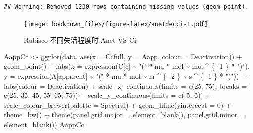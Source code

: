 \documentclass[
]{krantz}
\makeatletter
\newenvironment{Shaded}{\begin{snugshade}}{\end{snugshade}}
\newcommand{\AttributeTok}[1]{\textcolor[rgb]{0.77,0.63,0.00}{#1}}
\newcommand{\DecValTok}[1]{\textcolor[rgb]{0.00,0.00,0.81}{#1}}
\newcommand{\FunctionTok}[1]{\textcolor[rgb]{0.00,0.00,0.00}{#1}}
\newcommand{\NormalTok}[1]{#1}
\newcommand{\OtherTok}[1]{\textcolor[rgb]{0.56,0.35,0.01}{#1}}
\newcommand{\SpecialCharTok}[1]{\textcolor[rgb]{0.00,0.00,0.00}{#1}}
\newcommand{\StringTok}[1]{\textcolor[rgb]{0.31,0.60,0.02}{#1}}
\newenvironment{kframe}{%
\medskip{}
\setlength{\fboxsep}{.8em}
 \def\at@end@of@kframe{}%
 \ifinner\ifhmode%
  \def\at@end@of@kframe{\end{minipage}}%
  \begin{minipage}{\columnwidth}%
 \fi\fi%
 \def\FrameCommand##1{\hskip\@totalleftmargin \hskip-\fboxsep
 \colorbox{shadecolor}{##1}\hskip-\fboxsep
     \hskip-\linewidth \hskip-\@totalleftmargin \hskip\columnwidth}%
 \MakeFramed {\advance\hsize-\width
   \@totalleftmargin\z@ \linewidth\hsize
   \@setminipage}}%
 {\par\unskip\endMakeFramed%
 \at@end@of@kframe}
\renewenvironment{Shaded}{\begin{kframe}}{\end{kframe}}
\makeatother
\begin{document}
\begin{verbatim}
## Warning: Removed 1230 rows containing missing values (geom_point).
\end{verbatim}

\begin{figure}
\centering
\texttt{[image: bookdown\_files/figure-latex/anetdecci-1.pdf]}
\caption{\label{fig:anetdecci}Rubisco 不同失活程度时 Anet VS Ci}
\end{figure}

\begin{Shaded}
\begin{Highlighting}[]
\NormalTok{AappCc }\OtherTok{\textless{}{-}}
  \FunctionTok{ggplot}\NormalTok{(data, }\FunctionTok{aes}\NormalTok{(}\AttributeTok{x =}\NormalTok{ Ccfull, }\AttributeTok{y =}\NormalTok{ Aapp, }\AttributeTok{colour =}\NormalTok{ Deactivation)) }\SpecialCharTok{+}
  \FunctionTok{geom\_point}\NormalTok{() }\SpecialCharTok{+}
  \FunctionTok{labs}\NormalTok{(}\AttributeTok{x =} \FunctionTok{expression}\NormalTok{(C[c] }\SpecialCharTok{\textasciitilde{}} \StringTok{"("} \SpecialCharTok{*}\NormalTok{ mu }\SpecialCharTok{*}\NormalTok{ mol }\SpecialCharTok{\textasciitilde{}}\NormalTok{ mol }\SpecialCharTok{\^{}}\NormalTok{ \{}
    \SpecialCharTok{{-}}\DecValTok{1}
\NormalTok{  \} }\SpecialCharTok{*} \StringTok{")"}\NormalTok{),}
  \AttributeTok{y =} \FunctionTok{expression}\NormalTok{(A[apparent] }\SpecialCharTok{\textasciitilde{}} \StringTok{"("} \SpecialCharTok{*}\NormalTok{ mu }\SpecialCharTok{*}\NormalTok{ mol }\SpecialCharTok{\textasciitilde{}}\NormalTok{ m }\SpecialCharTok{\^{}}\NormalTok{ \{}
    \SpecialCharTok{{-}}\DecValTok{2}
\NormalTok{  \} }\SpecialCharTok{\textasciitilde{}}\NormalTok{ s }\SpecialCharTok{\^{}}\NormalTok{ \{}
    \SpecialCharTok{{-}}\DecValTok{1}
\NormalTok{  \} }\SpecialCharTok{*} \StringTok{")"}\NormalTok{)) }\SpecialCharTok{+}
  \FunctionTok{labs}\NormalTok{(}\AttributeTok{colour =} \StringTok{\textquotesingle{}Deactivation\textquotesingle{}}\NormalTok{) }\SpecialCharTok{+}
  \FunctionTok{scale\_x\_continuous}\NormalTok{(}\AttributeTok{limits =} \FunctionTok{c}\NormalTok{(}\DecValTok{25}\NormalTok{, }\DecValTok{75}\NormalTok{),}
                     \AttributeTok{breaks =} \FunctionTok{c}\NormalTok{(}\DecValTok{25}\NormalTok{, }\DecValTok{35}\NormalTok{, }\DecValTok{45}\NormalTok{, }\DecValTok{55}\NormalTok{, }\DecValTok{65}\NormalTok{, }\DecValTok{75}\NormalTok{)) }\SpecialCharTok{+}
  \FunctionTok{scale\_y\_continuous}\NormalTok{(}\AttributeTok{limits =} \FunctionTok{c}\NormalTok{(}\SpecialCharTok{{-}}\DecValTok{5}\NormalTok{, }\DecValTok{5}\NormalTok{)) }\SpecialCharTok{+}
  \FunctionTok{scale\_colour\_brewer}\NormalTok{(}\AttributeTok{palette =} \StringTok{\textquotesingle{}Spectral\textquotesingle{}}\NormalTok{) }\SpecialCharTok{+}
  \FunctionTok{geom\_hline}\NormalTok{(}\AttributeTok{yintercept =} \DecValTok{0}\NormalTok{) }\SpecialCharTok{+}
  \FunctionTok{theme\_bw}\NormalTok{() }\SpecialCharTok{+}
  \FunctionTok{theme}\NormalTok{(}\AttributeTok{panel.grid.major =} \FunctionTok{element\_blank}\NormalTok{(),}
        \AttributeTok{panel.grid.minor =} \FunctionTok{element\_blank}\NormalTok{())}
\NormalTok{AappCc}
\end{Highlighting}
\end{Shaded}
\end{document}
